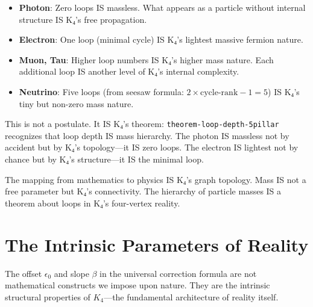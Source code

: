 \documentclass[11pt,a4paper]{book}
\begin{document}
\begin{itemize}
\item \textbf{Photon}: Zero loops IS massless. What appears as a particle without internal structure IS K₄'s free propagation.
\item \textbf{Electron}: One loop (minimal cycle) IS K₄'s lightest massive fermion nature.
\item \textbf{Muon, Tau}: Higher loop numbers IS K₄'s higher mass nature. Each additional loop IS another level of K₄'s internal complexity.
\item \textbf{Neutrino}: Five loops (from seesaw formula: $2 \times \text{cycle-rank} - 1 = 5$) IS K₄'s tiny but non-zero mass nature.
\end{itemize}

This is not a postulate. It IS K₄'s theorem: \texttt{theorem-loop-depth-5pillar} recognizes that loop depth IS mass hierarchy. The photon IS massless not by accident but by K₄'s topology—it IS zero loops. The electron IS lightest not by chance but by K₄'s structure—it IS the minimal loop.

The mapping from mathematics to physics IS K₄'s graph topology. Mass IS not a free parameter but K₄'s connectivity. The hierarchy of particle masses IS a theorem about loops in K₄'s four-vertex reality.

\chapter{The Intrinsic Parameters of Reality}

The offset $\epsilon_0$ and slope $\beta$ in the universal correction formula are not mathematical constructs we impose upon nature.
They are the intrinsic structural properties of $K_4$—the fundamental architecture of reality itself.
\end{document}
